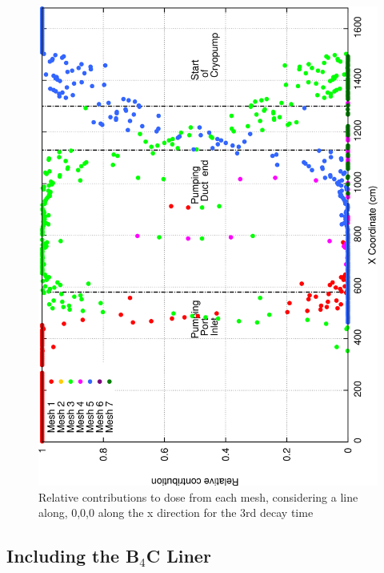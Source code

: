 \documentclass[12pt]{article}
\begin{document}
\begin{figure}[ht!]
\centering
\includegraphics[clip,scale=0.25]{../plots/crosstalk/nob4c/lp/dc3_rel.png}
\caption{Relative contributions to dose from each mesh, considering a line along, 0,0,0 along the x direction for the 3rd decay time}
\label{fig:ct_lp_dc3_rel}
\end{figure}

\newpage
\clearpage
\subsection{Including the B$_4$C Liner}
\label{appendix:pt_ct_b4c}
\end{document}

